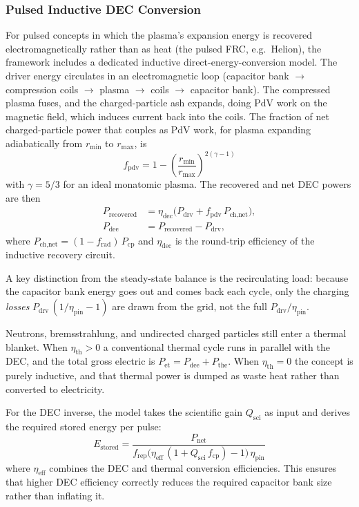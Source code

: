\documentclass{article}
\begin{document}
\subsubsection{Pulsed Inductive DEC Conversion}
For pulsed concepts in which the plasma's expansion energy is recovered
electromagnetically rather than as heat (the pulsed FRC, e.g.\ Helion),
the framework includes a dedicated inductive
direct-energy-conversion model.
The driver energy circulates in an electromagnetic loop (capacitor bank
$\to$ compression coils $\to$ plasma $\to$ coils $\to$ capacitor bank). The
compressed plasma fuses, and the charged-particle ash expands, doing PdV
work on the magnetic field, which induces current back into the coils. The fraction of net charged-particle
power that couples as PdV work, for plasma expanding adiabatically from
$r_{\min}$ to $r_{\max}$, is
\begin{equation}
f_{\text{pdv}} = 1 - \left(\frac{r_{\min}}{r_{\max}}\right)^{\!2(\gamma-1)}
\end{equation}
with $\gamma = 5/3$ for an ideal monatomic plasma. The recovered and
net DEC powers are then
\begin{align}
P_{\text{recovered}} &= \eta_{\text{dec}} \bigl(P_{\text{drv}}
  + f_{\text{pdv}} \, P_{\text{ch,net}}\bigr), \\
P_{\text{dee}} &= P_{\text{recovered}} - P_{\text{drv}},
\end{align}
where $P_{\text{ch,net}} = (1 - f_{\text{rad}})\,P_{\text{cp}}$
and $\eta_{\text{dec}}$ is the round-trip efficiency of the
inductive recovery circuit.

A key distinction from the steady-state balance is the recirculating
load: because the capacitor bank energy goes out and comes back each
cycle, only the charging \emph{losses}
$P_{\text{drv}}\,(1/\eta_{\text{pin}} - 1)$ are drawn from the grid,
not the full $P_{\text{drv}}/\eta_{\text{pin}}$.

Neutrons, bremsstrahlung, and undirected charged particles still enter
a thermal blanket. When $\eta_{\text{th}} > 0$ a conventional thermal
cycle runs in parallel with the DEC, and the total gross electric is
$P_{\text{et}} = P_{\text{dee}} + P_{\text{the}}$. When
$\eta_{\text{th}} = 0$ the concept is purely inductive, and that thermal
power is dumped as waste heat rather than converted to electricity.

For the DEC inverse, the model takes the scientific gain $Q_{\text{sci}}$
as input and derives the required stored energy per pulse:
\begin{equation}
E_{\text{stored}} = \frac{P_{\text{net}}}{f_{\text{rep}} \bigl(
  \eta_{\text{eff}}\,(1 + Q_{\text{sci}}\,f_{\text{cp}}) - 1 \bigr)
  \,\eta_{\text{pin}}}
\end{equation}
where $\eta_{\text{eff}}$ combines the DEC and thermal conversion
efficiencies. This ensures that higher DEC efficiency correctly reduces
the required capacitor bank size rather than inflating it.
\end{document}
